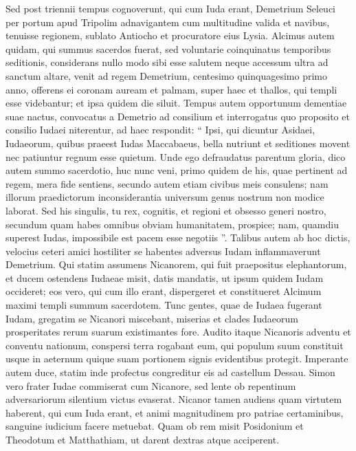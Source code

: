 \begin{biblechapter}
\begin{biblechapter}
\begin{biblechapter}
\begin{biblechapter}
\begin{biblechapter}
\begin{biblechapter}
\begin{biblechapter}
\begin{biblechapter}
\begin{biblechapter}
\begin{biblechapter}
\begin{biblechapter}
\begin{biblechapter}
\begin{biblechapter}
\begin{biblechapter}
\verse Sed post triennii tempus cognoverunt, qui cum Iuda erant, Demetrium Seleuci per portum apud Tripolim adnavigantem cum multitudine valida et navibus, 
\verse tenuisse regionem, sublato Antiocho et procuratore eius Lysia. 
\verse Alcimus autem quidam, qui summus sacerdos fuerat, sed voluntarie coinquinatus temporibus seditionis, considerans nullo modo sibi esse salutem neque accessum ultra ad sanctum altare, 
\verse venit ad regem Demetrium, centesimo quinquagesimo primo anno, offerens ei coronam auream et palmam, super haec et thallos, qui templi esse videbantur; et ipsa quidem die siluit. 
\verse Tempus autem opportunum dementiae suae nactus, convocatus a Demetrio ad consilium et interrogatus quo proposito et consilio Iudaei niterentur, 
\verse ad haec respondit: “ Ipsi, qui dicuntur Asidaei, Iudaeorum, quibus praeest Iudas Maccabaeus, bella nutriunt et seditiones movent nec patiuntur regnum esse quietum. 
\verse Unde ego defraudatus parentum gloria, dico autem summo sacerdotio, huc nunc veni, 
\verse primo quidem de his, quae pertinent ad regem, mera fide sentiens, secundo autem etiam civibus meis consulens; nam illorum praedictorum inconsiderantia universum genus nostrum non modice laborat. 
\verse Sed his singulis, tu rex, cognitis, et regioni et obsesso generi nostro, secundum quam habes omnibus obviam humanitatem, prospice; 
\verse nam, quamdiu superest Iudas, impossibile est pacem esse negotiis ”.
 \verse Talibus autem ab hoc dictis, velocius ceteri amici hostiliter se habentes adversus Iudam inflammaverunt Demetrium. 
\verse Qui statim assumens Nicanorem, qui fuit praepositus elephantorum, et ducem ostendens Iudaeae misit, 
\verse datis mandatis, ut ipsum quidem Iudam occideret; eos vero, qui cum illo erant, dispergeret et constitueret Alcimum maximi templi summum sacerdotem. 
\verse Tunc gentes, quae de Iudaea fugerant Iudam, gregatim se Nicanori miscebant, miserias et clades Iudaeorum prosperitates rerum suarum existimantes fore.
 \verse Audito itaque Nicanoris adventu et conventu nationum, conspersi terra rogabant eum, qui populum suum constituit usque in aeternum quique suam portionem signis evidentibus protegit. 
\verse Imperante autem duce, statim inde profectus congreditur eis ad castellum Dessau. 
\verse Simon vero frater Iudae commiserat cum Nicanore, sed lente ob repentinum adversariorum silentium victus evaserat.
 \verse Nicanor tamen audiens quam virtutem haberent, qui cum Iuda erant, et animi magnitudinem pro patriae certaminibus, sanguine iudicium facere metuebat. 
\verse Quam ob rem misit Posidonium et Theodotum et Matthathiam, ut darent dextras atque acciperent. 

\end{biblechapter}
\end{biblechapter}
\end{biblechapter}
\end{biblechapter}
\end{biblechapter}
\end{biblechapter}
\end{biblechapter}
\end{biblechapter}
\end{biblechapter}
\end{biblechapter}
\end{biblechapter}
\end{biblechapter}
\end{biblechapter}
\end{biblechapter}

